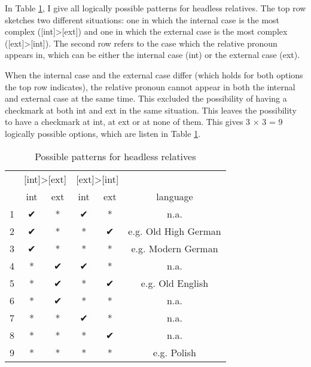 In Table \ref{tbl:possible-headless-relatives}, I give all logically possible patterns for headless relatives. The top row sketches two different situations: one in which the internal case is the most complex ([\ac{int}]>[\ac{ext}]) and one in which the external case is the most complex ([\ac{ext}]>[\ac{int}]). The second row refers to the case which the relative pronoun appears in, which can be either the internal case (\ac{int}) or the external case (\ac{ext}).

When the internal case and the external case differ (which holds for both options the top row indicates), the relative pronoun cannot appear in both the internal and external case at the same time. This excluded the possibility of having a checkmark at both \ac{int} and \ac{ext} in the same situation. This leaves the possibility to have a checkmark at \ac{int}, at \ac{ext} or at none of them. This gives 3 × 3 = 9 logically possible options, which are listen in Table \ref{tbl:possible-headless-relatives}.

\begin{table}[H]
  \center
  \caption{Possible patterns for headless relatives}
    \begin{tabular}{ccc|ccc}
    \toprule
      &   \multicolumn{2}{c}{[\ac{int}]>[\ac{ext}]} & \multicolumn{2}{|c}{[\ac{ext}]>[\ac{int}]} &                  \\
          \cmidrule(lr){2-3}                      \cmidrule(lr){4-5}
      &   \ac{int}            & \ac{ext}          & \ac{int}          & \ac{ext}            & language              \\
          \cmidrule(lr){2-2}  \cmidrule(lr){3-3}  \cmidrule(lr){4-4}  \cmidrule(lr){5-5}    \cmidrule(lr){6-6}
    1 &   ✔                   & *                 & ✔               & *                     & n.a.                  \\
    2 &   ✔                   & *                 & *               & ✔                     & e.g. Old High German  \\
    3 &   ✔                   & *                 & *               & *                     & e.g. Modern German    \\
    4 &   {*}                 & ✔                 & ✔               & *                     & n.a.                  \\
    5 &   {*}                 & ✔                 & *               & ✔                     & e.g. Old English      \\
    6 &   {*}                 & ✔                 & *               & *                     & n.a.                  \\
    7 &   {*}                 & *                 & ✔               & *                     & n.a.                  \\
    8 &   {*}                 & *                 & *               & ✔                     & n.a.                  \\
    9 &   {*}                 & *                 & *               & *                     & e.g. Polish           \\
    \bottomrule
  \end{tabular}
    \label{tbl:possible-headless-relatives}
\end{table}


